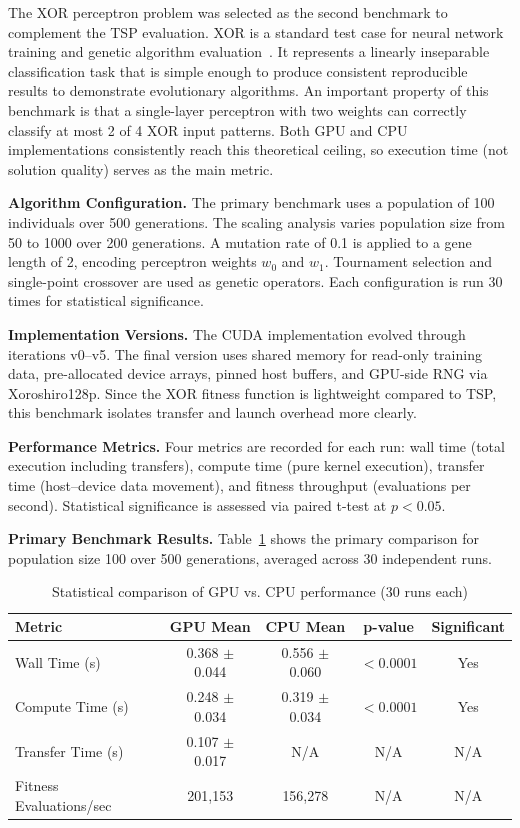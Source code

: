 \documentclass[a4paper,14pt]{extarticle}
\begin{document}

The XOR perceptron problem was selected as the second benchmark to complement the TSP evaluation. XOR is a standard test case for neural network training and genetic algorithm evaluation~\cite{googlebooks_xor_perceptron}. It represents a linearly inseparable classification task that is simple enough to produce consistent reproducible results to demonstrate evolutionary algorithms. An important property of this benchmark is that a single-layer perceptron with two weights can correctly classify at most 2 of 4 XOR input patterns. Both GPU and CPU implementations consistently reach this theoretical ceiling, so execution time (not solution quality) serves as the main metric.

\textbf{Algorithm Configuration.} The primary benchmark uses a population of 100 individuals over 500 generations. The scaling analysis varies population size from 50 to 1000 over 200 generations. A mutation rate of 0.1 is applied to a gene length of 2, encoding perceptron weights $w_0$ and $w_1$. Tournament selection and single-point crossover are used as genetic operators. Each configuration is run 30 times for statistical significance.

\textbf{Implementation Versions.} The CUDA implementation evolved through iterations v0--v5. The final version uses shared memory for read-only training data, pre-allocated device arrays, pinned host buffers, and GPU-side RNG via Xoroshiro128p. Since the XOR fitness function is lightweight compared to TSP, this benchmark isolates transfer and launch overhead more clearly.

\textbf{Performance Metrics.} Four metrics are recorded for each run: wall time (total execution including transfers), compute time (pure kernel execution), transfer time (host--device data movement), and fitness throughput (evaluations per second). Statistical significance is assessed via paired t-test at $p < 0.05$.


\textbf{Primary Benchmark Results.} Table~\ref{tab:primary_results} shows the primary comparison for population size 100 over 500 generations, averaged across 30 independent runs.

\begin{table}[H]
\centering
\caption{Statistical comparison of GPU vs. CPU performance (30 runs each)}
\label{tab:primary_results}
\begin{tabular}{@{}lcccc@{}}
\toprule
\textbf{Metric} & \textbf{GPU Mean} & \textbf{CPU Mean} & \textbf{p-value} & \textbf{Significant} \\
\midrule
Wall Time (s) & 0.368 $\pm$ 0.044 & 0.556 $\pm$ 0.060 & $< 0.0001$ & Yes \\
Compute Time (s) & 0.248 $\pm$ 0.034 & 0.319 $\pm$ 0.034 & $< 0.0001$ & Yes \\
Transfer Time (s) & 0.107 $\pm$ 0.017 & N/A & N/A & N/A \\
Fitness Evaluations/sec & 201,153 & 156,278 & N/A & N/A \\
\bottomrule
\end{tabular}
\end{table}
\end{document}

